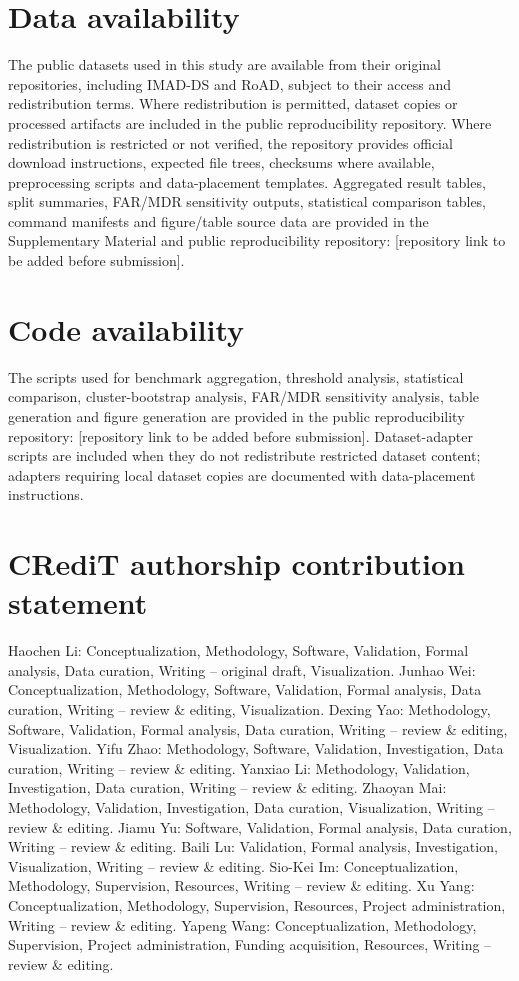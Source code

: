 \section*{Data availability}
The public datasets used in this study are available from their original repositories, including IMAD-DS and RoAD, subject to their access and redistribution terms. Where redistribution is permitted, dataset copies or processed artifacts are included in the public reproducibility repository. Where redistribution is restricted or not verified, the repository provides official download instructions, expected file trees, checksums where available, preprocessing scripts and data-placement templates. Aggregated result tables, split summaries, FAR/MDR sensitivity outputs, statistical comparison tables, command manifests and figure/table source data are provided in the Supplementary Material and public reproducibility repository: [repository link to be added before submission].

\section*{Code availability}
The scripts used for benchmark aggregation, threshold analysis, statistical comparison, cluster-bootstrap analysis, FAR/MDR sensitivity analysis, table generation and figure generation are provided in the public reproducibility repository: [repository link to be added before submission]. Dataset-adapter scripts are included when they do not redistribute restricted dataset content; adapters requiring local dataset copies are documented with data-placement instructions.

\section*{CRediT authorship contribution statement}
Haochen Li: Conceptualization, Methodology, Software, Validation, Formal analysis, Data curation, Writing -- original draft, Visualization.
Junhao Wei: Conceptualization, Methodology, Software, Validation, Formal analysis, Data curation, Writing -- review \& editing, Visualization.
Dexing Yao: Methodology, Software, Validation, Formal analysis, Data curation, Writing -- review \& editing, Visualization.
Yifu Zhao: Methodology, Software, Validation, Investigation, Data curation, Writing -- review \& editing.
Yanxiao Li: Methodology, Validation, Investigation, Data curation, Writing -- review \& editing.
Zhaoyan Mai: Methodology, Validation, Investigation, Data curation, Visualization, Writing -- review \& editing.
Jiamu Yu: Software, Validation, Formal analysis, Data curation, Writing -- review \& editing.
Baili Lu: Validation, Formal analysis, Investigation, Visualization, Writing -- review \& editing.
Sio-Kei Im: Conceptualization, Methodology, Supervision, Resources, Writing -- review \& editing.
Xu Yang: Conceptualization, Methodology, Supervision, Resources, Project administration, Writing -- review \& editing.
Yapeng Wang: Conceptualization, Methodology, Supervision, Project administration, Funding acquisition, Resources, Writing -- review \& editing.

